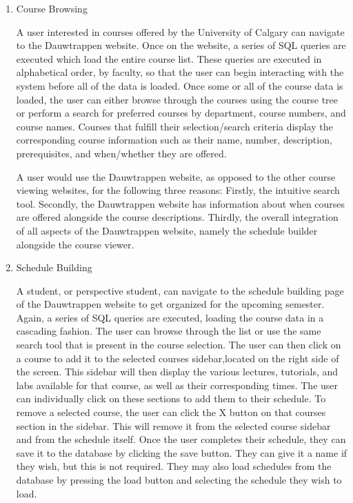 \documentclass[twoside=false,a4paper,11pt]{article}
\theoremstyle{mytheor}
\begin{document}
\begin{enumerate}
	\item Course Browsing

	A user interested in courses offered by the University of Calgary can navigate to the Dauwtrappen website. Once on the website, a series of SQL queries are executed which load the entire course list. These queries are executed in alphabetical order, by faculty, so that the user can begin interacting with the system before all of the data is loaded.
	Once some or all of the course data is loaded, the user can either browse through the courses using the course tree or perform a search for preferred courses by department, course numbers, and course names. Courses that fulfill their selection/search criteria display the corresponding course information such as their name, number, description, prerequisites, and when/whether they are offered.

	A user would use the Dauwtrappen website, as opposed to the other course viewing websites, for the following three reasons:
	Firstly, the intuitive search tool.
	Secondly, the Dauwtrappen website has information about when courses are offered alongside the course descriptions.
	Thirdly, the overall integration of all aspects of the Dauwtrappen website, namely the schedule builder alongside the course viewer.

	\item Schedule Building
	
	A student, or perspective student, can navigate to the schedule building page of the Dauwtrappen website to get organized for the upcoming semester. Again, a series of SQL queries are executed, loading the course data in a cascading fashion. The user can browse through the list or use the same search tool that is present in the course selection. 
	The user can then click on a course to add it to the selected courses sidebar,located on the right side of the screen. This sidebar will then display the various lectures, tutorials, and labs available for that course, as well as their corresponding times. The user can individually click on these sections to add them to their schedule. To remove a selected course, the user can click the X button on that courses section in the sidebar. This will remove it from the selected course sidebar and from the schedule itself. 
	Once the user completes their schedule, they can save it to the database by clicking the save button. They can give it a name if they wish, but this is not required.
	They may also load schedules from the database by pressing the load button and selecting the schedule they wish to load.  


\end{enumerate}
\end{document}
